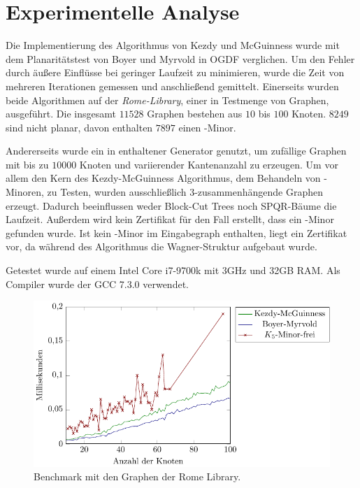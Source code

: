 \chapter{Experimentelle Analyse}
\label{cha:analyse}

Die Implementierung des Algorithmus von Kezdy und McGuinness wurde mit dem Planaritätstest von Boyer und Myrvold in OGDF verglichen.
Um den Fehler durch äußere Einflüsse bei geringer Laufzeit zu minimieren, wurde die Zeit von mehreren Iterationen gemessen und anschließend gemittelt.
Einerseits wurden beide Algorithmen auf der \emph{Rome-Library}, einer in \cite{BGLT+97} Testmenge von Graphen, ausgeführt.
Die insgesamt $11528$ Graphen bestehen aus $10$ bis $100$ Knoten.
$8249$ sind nicht planar, davon enthalten $7897$ einen \kf-Minor.

Andererseits wurde ein in \OGDF enthaltener Generator genutzt, um zufällige Graphen mit bis zu $10000$ Knoten und variierender Kantenanzahl zu erzeugen.
Um vor allem den Kern des Kezdy-McGuinness Algorithmus, dem Behandeln von \kdd-Minoren, zu Testen, wurden ausschließlich $3$-zusammenhängende Graphen erzeugt.
Dadurch beeinflussen weder Block-Cut Trees noch SPQR-Bäume die Laufzeit.
Außerdem wird kein Zertifikat für den Fall erstellt, dass ein \kf-Minor gefunden wurde.
Ist kein \kf-Minor im Eingabegraph enthalten, liegt ein Zertifikat vor, da während des Algorithmus die Wagner-Struktur aufgebaut wurde.

Getestet wurde auf einem Intel Core i7-9700k mit 3GHz und 32GB RAM.
Als Compiler wurde der GCC 7.3.0 verwendet.

\begin{figure}[H]
  \centering
  \includegraphics[width=\textwidth,height=\textheight,keepaspectratio]{plots/Benchmarks_Rome.pdf}
  \caption{Benchmark mit den Graphen der Rome Library.}
  \label{fig:Benchmarks-Rome}
\end{figure}

